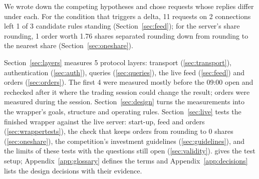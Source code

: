  We wrote down the competing hypotheses and chose requests whose replies differ under each. For the condition that triggers a delta, 11 requests on 2 connections left 1 of 3 candidate rules standing (Section~\ref{sec:feed}); for the server's share rounding, 1 order worth 1.76 shares separated rounding down from rounding to the nearest share (Section~\ref{sec:oneshare}).

 Section~\ref{sec:layers} measures 5 protocol layers: transport (\ref{sec:transport}), authentication (\ref{sec:auth}), queries (\ref{sec:queries}), the live feed (\ref{sec:feed}) and orders (\ref{sec:orders}). The first 4 were measured mostly before the 09:00 open and rechecked after it where the trading session could change the result; orders were measured during the session. Section~\ref{sec:design} turns the measurements into the wrapper's goals, structure and operating rules. Section~\ref{sec:live} tests the finished wrapper against the live server: start-up, feed and orders (\ref{sec:wrappertests}), the check that keeps orders from rounding to 0 shares (\ref{sec:oneshare}), the competition's investment guidelines (\ref{sec:guidelines}), and the limits of these tests with the questions still open (\ref{sec:validity}).  gives the test setup; Appendix~\ref{app:glossary} defines the terms and Appendix~\ref{app:decisions} lists the design decisions with their evidence.


